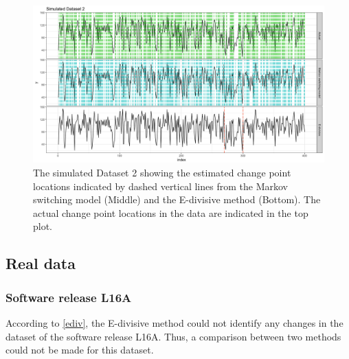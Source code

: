 \begin{figure}[H]
\begin{centering}
\includegraphics[scale=0.35]{picture/compare_sim2}
\par\end{centering}
\caption{The simulated Dataset 2 showing the estimated change point locations
indicated by dashed vertical lines from the Markov switching model
(Middle) and the E-divisive method (Bottom). The actual change point
locations in the data are indicated in the top plot. }

\label{compare_sim2}
\end{figure}


\subsection{Real data \label{subsec:Real-data}}

\subsubsection{Software release L16A}

According to \ref{ediv}, the E-divisive method could not identify
any changes in the dataset of the software release L16A. Thus, a comparison
between two methods could not be made for this dataset. 

